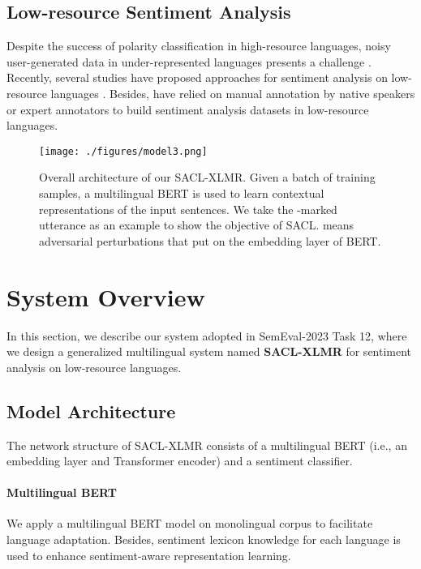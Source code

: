 \documentclass[11pt]{article}
\begin{document}
\subsection{Low-resource Sentiment Analysis}
Despite the success of polarity classification in high-resource languages, noisy user-generated data in under-represented languages presents a challenge \citep{DBLP:conf/coling/YimamAAB20}. 
Recently, several studies have proposed approaches for sentiment analysis on low-resource languages \citep{DBLP:journals/air/LoCCC17,DBLP:conf/coling/YimamAAB20}.
Besides, \citet{moudjari-etal-2020-algerian,adebara-abdul-mageed-2022-towards,muhammad2023afrisenti} have relied on manual annotation by native speakers or expert annotators to build sentiment analysis datasets in low-resource languages.

\begin{figure*}[t]
    \centering
    \texttt{[image: ./figures/model3.png]} 
    \caption{Overall architecture of our SACL-XLMR.
    Given a batch of training samples, a multilingual BERT is used to learn contextual representations of the input sentences. We take the -marked utterance as an example to show the objective of SACL.
     means adversarial perturbations that put on the embedding layer of BERT.
    }
    \label{fig:model}
\end{figure*}


\section{System Overview}

In this section, we describe our system adopted in SemEval-2023 Task 12, where we design a generalized multilingual system named \textbf{SACL-XLMR} for sentiment analysis on low-resource languages.


\subsection{Model Architecture}
The network structure of SACL-XLMR consists of a multilingual BERT (i.e., an embedding layer and  Transformer encoder) and a sentiment classifier.

\paragraph{Multilingual BERT} \label{sec:xlmr}
We apply a multilingual BERT model \citep{DBLP:conf/nips/ConneauL19,DBLP:conf/coling/AlabiAMK22}
on monolingual corpus to facilitate language adaptation. Besides, sentiment lexicon knowledge for each language is used to enhance sentiment-aware representation learning.
\end{document}
